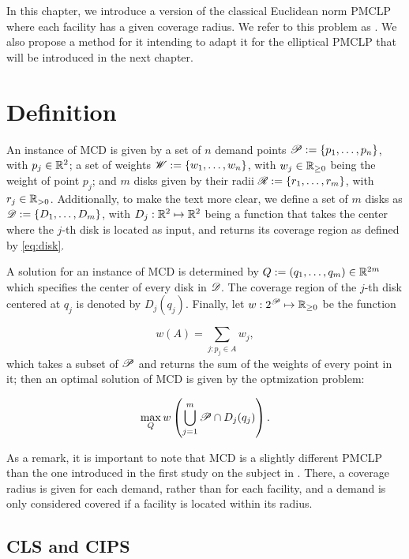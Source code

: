 In this chapter, we introduce a version of the classical Euclidean norm PMCLP where each facility has a given coverage radius. 
We refer to this problem as . We also propose a method for it intending to adapt it for the elliptical PMCLP that will be introduced in the next chapter. 

\section{Definition}

An instance of MCD is given by a set of $n$ demand points $\mathscr{P}:=\{p_1, \dots, p_n\}$, with $p_j\in\mathbb{R}^2$; a set of weights $\mathscr{W}:=\{w_1, \dots, w_n\}$, with $w_j\in\mathbb{R}_{\ge0}$ being the weight of point $p_j$; and $m$ disks given by their radii $\mathscr{R}:=\{r_1, \dots, r_m\}$, with $r_j\in\mathbb{R}_{>0}$. 
Additionally, to make the text more clear, we define a set of $m$ disks as $\mathscr{D}:=\{D_1, \dots, D_m\}$, with $D_j : \mathbb{R}^2 \mapsto \mathbb{R}^2$ being a function that takes the center where the $j$-th disk is located as input, and returns its coverage region as defined by \autoref{eq:disk}.

A solution for an instance of MCD is determined by $Q:=(q_1, \dots, q_m) \in \mathbb{R}^{2m}$ which specifies the center of every disk in $\mathscr{D}$.
The coverage region of the $j$-th disk centered at $q_j$ is denoted by $D_j(q_j)$. Finally, let $w : 2^{\mathscr{P}} \mapsto \mathbb{R}_{\ge0}$ be the function

\begin{equation}\label{eq:subset_w}
w(A) = \sum_{j : p_j \in A} w_j,
\end{equation}
which takes a subset of $\mathscr{P}$ and returns the sum of the weights of every point in it; then an optimal solution of MCD is given by the optmization problem:

\begin{equation*}
\max_{Q} w\left(\bigcup_{j=1}^m \mathscr{P} \cap D_j(q_j)\right).
\end{equation*}

As a remark, it is important to note that MCD is a slightly different PMCLP than the one introduced in the first study on the subject in . There, a coverage radius is given for each demand, rather than for each facility, and a demand is only considered covered if a facility is located within its radius.

\subsection{CLS and CIPS}

